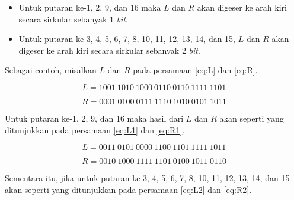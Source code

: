 \begin{itemize}
	\item Untuk putaran ke-1, 2, 9, dan 16 maka \begin{math}L\end{math} dan \begin{math}R\end{math} akan digeser ke arah kiri secara sirkular sebanyak 1 \textit{bit}.
	\item Untuk putaran ke-3, 4, 5, 6, 7, 8, 10, 11, 12, 13, 14, dan 15, \begin{math}L\end{math} dan \begin{math}R\end{math} akan digeser ke arah kiri secara sirkular sebanyak 2 \textit{bit}.
\end{itemize}

Sebagai contoh, misalkan \begin{math}L\end{math} dan \begin{math}R\end{math} pada persamaan \ref{eq:L} dan \ref{eq:R}.

\begin{equation}
	L = 1001\: 1010\: 1000\: 0110\: 0110\: 1111\: 1101
	\label{eq:L}
\end{equation}

\begin{equation}
	R = 0001\: 0100\: 0111\: 1110\: 1010\: 0101\: 1011
	\label{eq:R}
\end{equation}

Untuk putaran ke-1, 2, 9, dan 16 maka hasil dari \begin{math}L\end{math} dan \begin{math}R\end{math} akan seperti yang ditunjukkan pada persamaan \ref{eq:L1} dan \ref{eq:R1}.

\begin{equation}
	L = 0011\: 0101\: 0000\: 1100\: 1101\: 1111\: 1011
	\label{eq:L1}
\end{equation}

\begin{equation}
	R = 0010\: 1000\: 1111\: 1101\: 0100\: 1011\: 0110
	\label{eq:R1}
\end{equation}

Sementara itu, jika untuk putaran ke-3, 4, 5, 6, 7, 8, 10, 11, 12, 13, 14, dan 15 akan seperti yang ditunjukkan pada persamaan \ref{eq:L2} dan \ref{eq:R2}.

